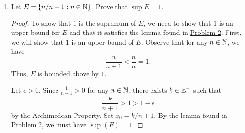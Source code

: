 \documentclass[11pt,a4paper]{article}
\begin{document}
\begin{enumerate}
\begin{proof}
    Suppose \( \gamma < \alpha  \). Our goal is to show that there exists some element \( x \in E  \) such that \( x > \gamma  \). We can use the fact that there exist \( {x}_{0} \in E  \) such that \( {x}_{0} > \alpha - 1 \) to say that
    \[  \gamma < \alpha < {x}_{0} + 1. \]
    Set \( x = {x}_{0} + 1  \) and thus, we have \( x > \gamma  \) for some \( x \in E  \). Therefore, \( \gamma  \) is NOT an upper bound of \( E  \) and so we conclude that 
    \[  \alpha = \sup E. \]
    \end{proof}

\item Let \( E  = \{ n / n + 1 : n \in \mathbb{N}  \}  \). Prove that \( \sup E  = 1  \). 
    \begin{proof}
    To show that \( 1  \) is the supremum of \( E  \), we need to show that \( 1  \) is an upper bound for \( E  \) and that it satisfies the lemma found in {\hyperref[Problem 2]{Problem 2}}. First, we will show that \( 1  \) is an upper bound of \( E  \). Observe that for any \( n \in \mathbb{N}  \), we have  
    \[  \frac{ n  }{  n + 1  }  < \frac{  n }{ n }  = 1.  \]
    Thus, \( E  \) is bounded above by \( 1 \). 

    Let \( \epsilon > 0  \). Since \( \frac{ 1 }{ n+1 }  > 0   \) for any \( n \in \mathbb{N} \), there exists \( k \in \mathbb{Z}^{+} \) such that  
    \[  \frac{ k  }{ n  + 1  }  > 1 > 1 - \epsilon \]
    by the Archimedean Property. Set \( {x}_{0} = k / n +1  \). By the lemma found in {\hyperref[Problem 2]{Problem 2}}, we must have \( \sup(E) = 1  \).  
    

     \end{proof}


\end{enumerate}
\end{document}
